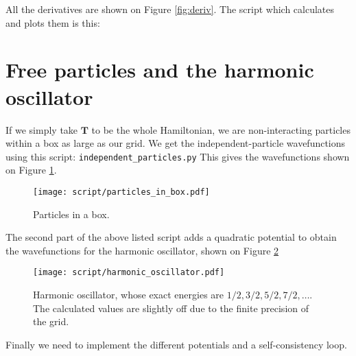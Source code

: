 \documentclass{article}
\begin{document}
\noindent All the derivatives are shown on Figure \ref{fig:deriv}.
The script which calculates and plots them is this:


\section{Free particles and the harmonic oscillator}
If we simply take $\mathbf T$ to be the whole Hamiltonian, we are
non-interacting particles within a box as large as our grid.
We get the independent-particle wavefunctions using this script:
\lstinline{independent_particles.py}
This gives the wavefunctions shown on Figure \ref{fig:box}.

\begin{figure}
  \texttt{[image: script/particles\_in\_box.pdf]}
  \caption{Particles in a box.}
  \label{fig:box}
\end{figure}

The second part of the above listed script adds a quadratic potential
to obtain the wavefunctions for the harmonic oscillator, shown on Figure
\ref{fig:harmonic}
\begin{figure}
  \texttt{[image: script/harmonic\_oscillator.pdf]}
  \caption{Harmonic oscillator, whose exact energies are $1/2, 3/2,
    5/2, 7/2, \ldots$.  The calculated values are slightly off due
  to the finite precision of the grid.}
  \label{fig:harmonic}
\end{figure}

Finally we need to implement the different potentials and a
self-consistency loop.


\end{document}
